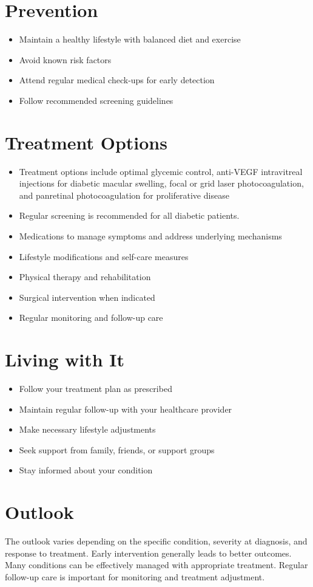 \section{Prevention}
\begin{itemize}[noitemsep]
  \item Maintain a healthy lifestyle with balanced diet and exercise
  \item Avoid known risk factors
  \item Attend regular medical check-ups for early detection
  \item Follow recommended screening guidelines
\end{itemize}
\section{Treatment Options}
\begin{itemize}[noitemsep]
  \item Treatment options include optimal glycemic control, anti-VEGF intravitreal injections for diabetic macular swelling, focal or grid laser photocoagulation, and panretinal photocoagulation for proliferative disease
  \item Regular screening is recommended for all diabetic patients.
  \item Medications to manage symptoms and address underlying mechanisms
  \item Lifestyle modifications and self-care measures
  \item Physical therapy and rehabilitation
  \item Surgical intervention when indicated
  \item Regular monitoring and follow-up care
\end{itemize}
\section{Living with It}
\begin{itemize}[noitemsep]
  \item Follow your treatment plan as prescribed
  \item Maintain regular follow-up with your healthcare provider
  \item Make necessary lifestyle adjustments
  \item Seek support from family, friends, or support groups
  \item Stay informed about your condition
\end{itemize}
\section{Outlook}
The outlook varies depending on the specific condition, severity at diagnosis, and response to treatment. Early intervention generally leads to better outcomes. Many conditions can be effectively managed with appropriate treatment. Regular follow-up care is important for monitoring and treatment adjustment.
